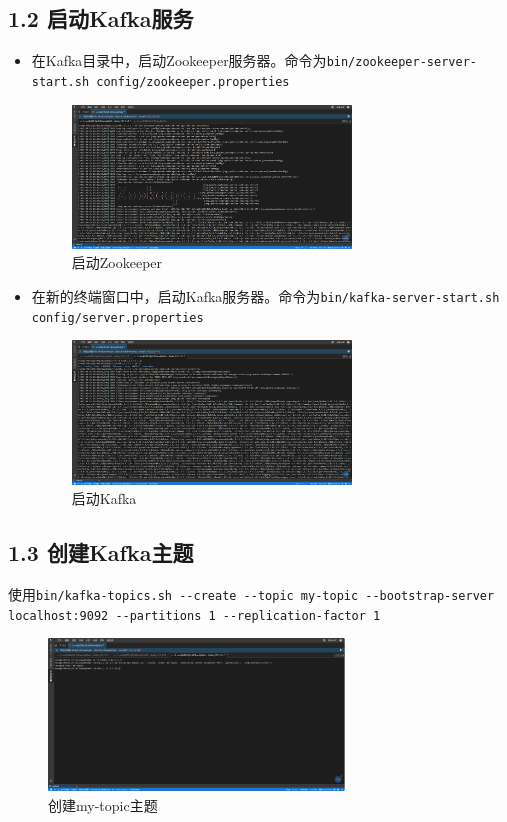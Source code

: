 \documentclass{article}
\begin{document}
\subsection*{1.2 启动Kafka服务}
\begin{itemize}
    \item 在Kafka目录中，启动Zookeeper服务器。命令为\lstinline[style=Style]|bin/zookeeper-server-start.sh config/zookeeper.properties|
    \begin{figure}[H]
        \centering
        \includegraphics[width=0.7\textwidth]{./pic/3.png}
        \caption{启动Zookeeper}
    \end{figure}
    \item 在新的终端窗口中，启动Kafka服务器。命令为\lstinline[style=Style]|bin/kafka-server-start.sh config/server.properties|
    \begin{figure}[H]
        \centering
        \includegraphics[width=0.7\textwidth]{./pic/4.png}
        \caption{启动Kafka}
    \end{figure}
\end{itemize}
\subsection*{1.3 创建Kafka主题}
使用\lstinline[style = Style]|bin/kafka-topics.sh --create --topic my-topic --bootstrap-server localhost:9092 --partitions 1 --replication-factor 1|
\begin{figure}[H]
    \centering
    \includegraphics[width=0.7\textwidth]{./pic/5.png}
    \caption{创建my-topic主题}
\end{figure}
\end{document}
